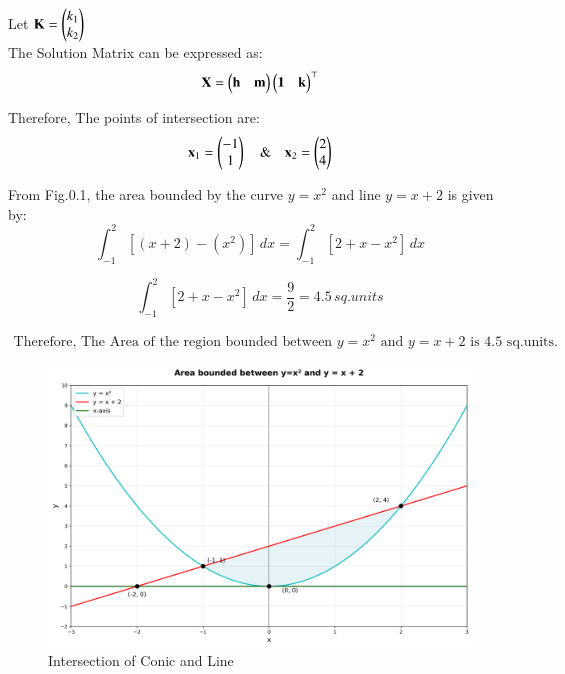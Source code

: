 \documentclass[journal]{IEEEtran}
\begin{document}
Let $\mathbf{K} = \begin{pmatrix}k_1 \\ k_2\end{pmatrix}$\\

The Solution Matrix can be expressed as: 
\begin{equation}
    \mathbf{X} = \begin{pmatrix}\mathbf{h} & \mathbf{m}\end{pmatrix}\begin{pmatrix}\mathbf{1} & \mathbf{k}\end{pmatrix}^\top
\end{equation}

Therefore, The points of intersection are:
\begin{equation}
    \mathbf{x}_1 = \begin{pmatrix}-1 \\ 1\end{pmatrix} \quad \& \quad \mathbf{x}_2 = \begin{pmatrix}2 \\4\end{pmatrix}
\end{equation}

\newpage

From Fig.0.1, the area bounded by the curve $y = x^2$ and line $y = x + 2$ is given by:
\begin{equation}
    \int_{-1}^{2} [(x+2) - (x^2)] \,dx = \int_{-1}^{2} [2 + x -x^2] \,dx
\end{equation}

\begin{equation}
 \int_{-1}^{2} [2 + x -x^2] \,dx = \dfrac{9}{2} = 4.5 \, sq.units   
\end{equation}

\begin{align*}
\boxed{\text{Therefore, The Area of the region bounded between $y=x^2$ and $y=x+2$ is 4.5 sq.units.}}
\end{align*}

\begin{figure}[htbp]
    \centering
    \includegraphics[width=\columnwidth]{figs/fig1.png}
    \caption{Intersection of Conic and Line}
    \label{fig:figs/fig1.png}
\end{figure}
\end{document}

